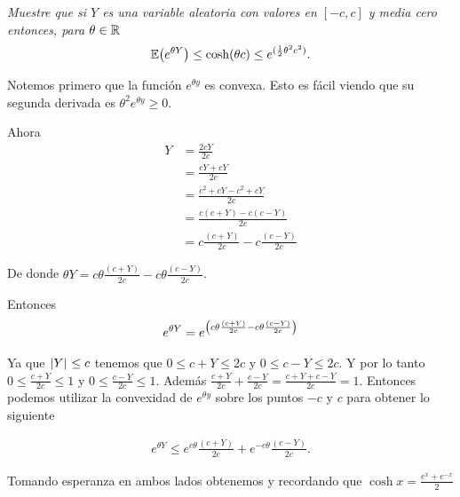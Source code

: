 \emph{
     Muestre que si $Y$ es una variable aleatoria con valores en $[-c,c]$ y media cero entonces, para $\theta\in\mathbb{R}$
    \begin{align}
        \mathbb{E}\! \left( e^{\theta Y} \right) \leq \cosh(\theta c)\leq e^{(\frac{1}{2}\theta^2c^2)}. 
    \end{align}
}

\afterstatement\par\null

Notemos primero que la función $e^{\theta y}$ es convexa. Esto es fácil viendo que su segunda derivada es
$\theta^2 e^{\theta y} \geq 0$.\par\null

Ahora
\begin{align}
    Y   &=  \frac{2cY}{2c}                              \\
        &=  \frac{cY + cY}{2c}                          \\
        &=  \frac{c^2 + cY - c^2+ cY}{2c}               \\
        &=  \frac{c(c + Y) - c (c - Y)}{2c}             \\  
        &=  c\frac{(c + Y)}{2c} - c \frac{(c - Y)}{2c}  
\end{align}\par\null

De donde $\theta Y = c\theta \frac{(c + Y)}{2c} - c\theta \frac{(c - Y)}{2c}$.\par\null

Entonces
\begin{align}
    e^{\theta Y} = e^{\left( c\theta \frac{(c + Y)}{2c} - c\theta \frac{(c - Y)}{2c}\right) }
\end{align}\par\null

Ya que $\hspace{.25mm}\left|Y\right|\hspace{.25mm} \leq c$ tenemos que $0 \leq c + Y \leq 2c$ y $0 \leq c - Y \leq 2c$. Y por lo tanto 
$0 \leq \frac{c + Y}{2c} \leq 1$ y $0 \leq \frac{c - Y}{2c} \leq 1$. 
Además $\frac{c + Y}{2c} + \frac{c - Y}{2c} = \frac{c + Y + c - Y }{2c} = 1$. Entonces podemos utilizar 
la convexidad de $e^{\theta y}$ sobre los puntos $-c$ y $c$ para obtener lo siguiente

\begin{align}
    e^{\theta Y} \leq e^{c\theta} \frac{(c + Y)}{2c} + e^{-c\theta} \frac{(c - Y)}{2c}.
\end{align}\par\null

Tomando esperanza en ambos lados obtenemos y recordando que $\cosh{x} = \frac{e^x + e^{-x}}{2}$

